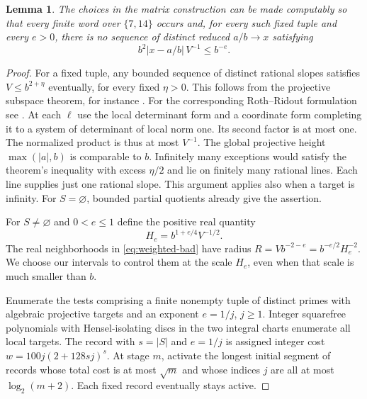 \documentclass[11pt,a4paper]{article}
\newtheorem{lemma}[theorem]{Lemma}
\begin{document}
\begin{lemma}\label{lem:weighted}
The choices in the matrix construction can be made computably so that
every finite word over $\{7,14\}$ occurs and, for every such fixed tuple
and every $e>0$, there is no sequence of distinct reduced $a/b\to x$
satisfying
\begin{equation}\label{eq:weighted-bad}
 b^2|x-a/b|\,V^{-1}\le b^{-e}.
\end{equation}
\end{lemma}
\begin{proof}
For a fixed tuple, any bounded sequence of distinct rational slopes
satisfies $V\le b^{2+\eta}$ eventually, for every fixed $\eta>0$.
This follows from the projective subspace theorem, for instance
\cite[Cor.~3.2]{ef}. For the corresponding Roth--Ridout formulation see \cite[Thm.~1]{cor}. At each $\ell$ use the local determinant
form and a coordinate form completing it to a system of determinant
of local norm one. Its second factor is at most one. The normalized
product is thus at most $V^{-1}$. The global projective height
$\max(|a|,b)$ is comparable to $b$. Infinitely many exceptions would
satisfy the theorem's inequality with excess $\eta/2$ and lie on
finitely many rational lines. Each line supplies just one rational
slope. This argument applies also when a target is infinity. For
$S=\varnothing$, bounded partial quotients already give the assertion.

For $S\ne\varnothing$ and $0<e\le1$ define the positive real quantity
\[
 H_e= b^{1+e/4}V^{-1/2}.
\]
The real neighborhoods in \eqref{eq:weighted-bad} have radius
$R=Vb^{-2-e}=b^{-e/2}H_e^{-2}$. We choose our intervals to control
them at the scale $H_e$, even when that scale is much smaller than $b$.

Enumerate the tests comprising a finite nonempty tuple of distinct
primes with algebraic projective targets and an exponent $e=1/j$,
$j\ge1$. Integer squarefree polynomials with Hensel-isolating discs
in the two integral charts enumerate all local targets. The record
with $s=|S|$ and $e=1/j$ is assigned integer cost
$w=100j(2+128sj)^s$. At stage $m$, activate the longest initial
segment of records whose total cost is at most $\sqrt m$ and whose
indices $j$ are all at most $\log_2(m+2)$. Each fixed record
eventually stays active.


\end{proof}
\end{document}
